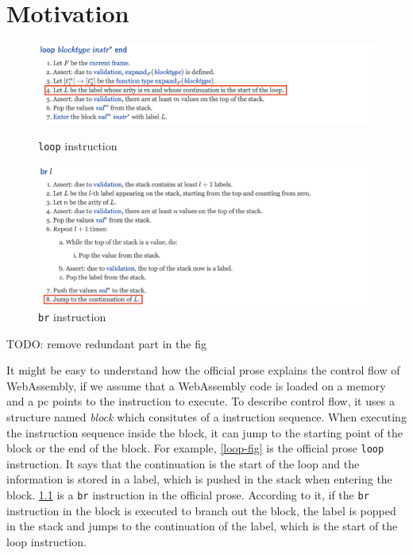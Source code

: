 
\chapter{Motivation}
\label{ch:motivation}
\noindent

\newcommand{\officialp}{official prose}
\newcommand{\spectecp}{SpecTec prose}

\begin{figure}[h!]
    \centerline{\includegraphics[width=15cm]{fig/loop}}
    \caption[Enter the caption title here]{\texttt{loop} instruction} \label{loop-fig}
    \centerline{\includegraphics[width=15cm]{fig/br}}
    \caption[Enter the caption title here]{\texttt{br} instruction} \label{br-fig}
\end{figure}
TODO: remove redundant part in the fig

It might be easy to understand how the \officialp{} explains the control flow
of WebAssembly, if we assume that a WebAssembly code is loaded on a memory and
a pc points to the instruction to execute.
To describe control flow, it uses a structure named \textit{block} which
consitutes of a instruction sequence.
When executing the instruction sequence inside the block, it can jump to the
starting point of the block or the end of the block.
For example, \cref{loop-fig} is the \officialp{} \texttt{loop} instruction.
It says that the continuation is the start of the loop and the information is
stored in a label, which is pushed in the stack when
entering the block.
\cref{br-fig} is a \texttt{br} instruction in the \officialp{}.
According to it, if the \texttt{br} instruction in the block is executed to
branch out the block, the label is popped in the stack and jumps to the
continuation of the label, which is the start of the loop instruction.

